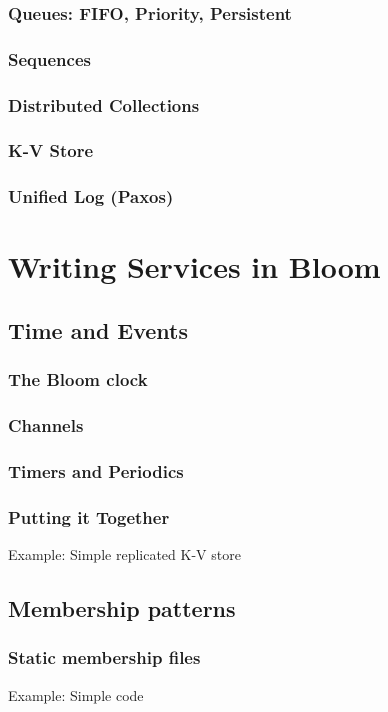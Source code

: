 \documentclass[]{book}
\begin{document}
        \subsection{Queues: FIFO, Priority, Persistent}
        \subsection{Sequences}
        \subsection{Distributed Collections}
        \subsection{K-V Store}
        \subsection{Unified Log (Paxos)}

\chapter{Writing Services in Bloom}
    \section{Time and Events}
        \subsection{The Bloom clock}
        \subsection{Channels}
        \subsection{Timers and Periodics}
        \subsection{Putting it Together}
        Example: Simple replicated K-V store
    \section{Membership patterns}
        \subsection{Static membership files}
         Example: Simple code
\end{document}
